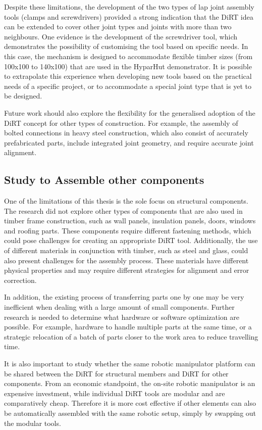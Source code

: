 Despite these limitations, the development of the two types of lap joint assembly tools (clamps and screwdrivers) provided a strong indication that the DiRT idea can be extended to cover other joint types and joints with more than two neighbours. One evidence is the development of the screwdriver tool, which demonstrates the possibility of customising the tool based on specific needs. In this case, the mechanism is designed to accommodate flexible timber sizes (from 100x100 to 140x100) that are used in the HyparHut demonstrator. It is possible to extrapolate this experience when developing new tools based on the practical needs of a specific project, or to accommodate a special joint type that is yet to be designed. 

Future work should also explore the flexibility for the generalised adoption of the DiRT concept for other types of construction. For example, the assembly of bolted connections in heavy steel construction, which also consist of accurately prefabricated parts, include integrated joint geometry, and require accurate joint alignment. 

\subsection{Study to Assemble other components}

One of the limitations of this thesis is the sole focus on structural components. The research did not explore other types of components that are also used in timber frame construction, such as wall panels, insulation panels, doors, windows and roofing parts. These components require different fastening methods, which could pose challenges for creating an appropriate DiRT tool. Additionally, the use of different materials in conjunction with timber, such as steel and glass, could also present challenges for the assembly process. These materials have different physical properties and may require different strategies for alignment and error correction.

In addition, the existing process of transferring parts one by one may be very inefficient when dealing with a large amount of small components. Further research is needed to determine what hardware or software optimization are possible. For example, hardware to handle multiple parts at the same time, or a strategic relocation of a batch of parts closer to the work area to reduce travelling time. 

It is also important to study whether the same robotic manipulator platform can be shared between the DiRT for structural members and DiRT for other components. From an economic standpoint, the on-site robotic manipulator is an expensive investment, while individual DiRT tools are modular and are comparatively cheap. Therefore it is more cost effective if other elements can also be automatically assembled with the same robotic setup, simply by swapping out the modular tools.

